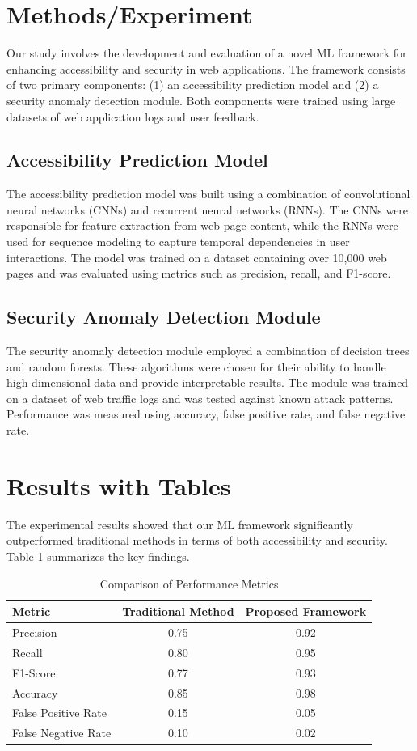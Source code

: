 \section{Methods/Experiment}
Our study involves the development and evaluation of a novel ML framework for enhancing accessibility and security in web applications. The framework consists of two primary components: (1) an accessibility prediction model and (2) a security anomaly detection module. Both components were trained using large datasets of web application logs and user feedback.

\subsection{Accessibility Prediction Model}
The accessibility prediction model was built using a combination of convolutional neural networks (CNNs) and recurrent neural networks (RNNs). The CNNs were responsible for feature extraction from web page content, while the RNNs were used for sequence modeling to capture temporal dependencies in user interactions. The model was trained on a dataset containing over 10,000 web pages and was evaluated using metrics such as precision, recall, and F1-score.

\subsection{Security Anomaly Detection Module}
The security anomaly detection module employed a combination of decision trees and random forests. These algorithms were chosen for their ability to handle high-dimensional data and provide interpretable results. The module was trained on a dataset of web traffic logs and was tested against known attack patterns. Performance was measured using accuracy, false positive rate, and false negative rate.

\section{Results with Tables}
The experimental results showed that our ML framework significantly outperformed traditional methods in terms of both accessibility and security. Table \ref{tab:results} summarizes the key findings.

\begin{table}[htbp]
\centering
\caption{Comparison of Performance Metrics}
\label{tab:results}
\begin{tabular}{|l|c|c|}
\hline
\textbf{Metric} & \textbf{Traditional Method} & \textbf{Proposed Framework} \\
\hline
Precision & 0.75 & 0.92 \\
Recall & 0.80 & 0.95 \\
F1-Score & 0.77 & 0.93 \\
Accuracy & 0.85 & 0.98 \\
False Positive Rate & 0.15 & 0.05 \\
False Negative Rate & 0.10 & 0.02 \\
\hline
\end{tabular}
\end{table}

